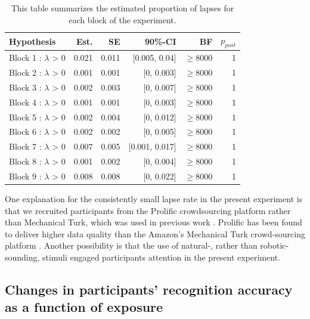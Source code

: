 \documentclass[
  11pt,
  man,mask,floatsintext]{apa6}
\begin{document}
\begin{table}[H]
\centering
\caption{\label{tab:hypothesis-table-lapse-by-block}This table summarizes the estimated proportion of lapses for each block of the experiment.}
\centering
\begin{tabular}[t]{>{\raggedright\arraybackslash}p{15em}rrrrr}
\toprule
Hypothesis & Est. & SE & 90\%-CI & BF & $p_{post}$\\
\midrule
Block 1 : $\lambda$ > 0 & 0.021 & 0.011 & {}[0.005, 0.04] & $\geq 8000 $ & 1\\
Block 2 : $\lambda$ > 0 & 0.001 & 0.001 & {}[0, 0.003] & $\geq 8000 $ & 1\\
Block 3 : $\lambda$ > 0 & 0.002 & 0.003 & {}[0, 0.007] & $\geq 8000 $ & 1\\
Block 4 : $\lambda$ > 0 & 0.001 & 0.001 & {}[0, 0.003] & $\geq 8000 $ & 1\\
Block 5 : $\lambda$ > 0 & 0.002 & 0.004 & {}[0, 0.012] & $\geq 8000 $ & 1\\
\addlinespace
Block 6 : $\lambda$ > 0 & 0.002 & 0.002 & {}[0, 0.005] & $\geq 8000 $ & 1\\
Block 7 : $\lambda$ > 0 & 0.007 & 0.005 & {}[0.001, 0.017] & $\geq 8000 $ & 1\\
Block 8 : $\lambda$ > 0 & 0.001 & 0.002 & {}[0, 0.004] & $\geq 8000 $ & 1\\
Block 9 : $\lambda$ > 0 & 0.008 & 0.008 & {}[0, 0.022] & $\geq 8000 $ & 1\\
\bottomrule
\end{tabular}
\end{table}

One explanation for the consistently small lapse rate in the present experiment is that we recruited participants from the Prolific crowdsourcing platform rather than Mechanical Turk, which was used in previous work \autocite{kleinschmidt-jaeger2016,kleinschmidt2020}. Prolific has been found to deliver higher data quality than the Amazon's Mechanical Turk crowd-sourcing platform \autocites{peer2017,adams2020,albert-smilek2023}[see also discussion in][]{bushong-jaeger2024}. Another possibility is that the use of natural-, rather than robotic-sounding, stimuli engaged participants attention in the present experiment.

\pagebreak

\subsection{Changes in participants' recognition accuracy as a function of exposure}\label{changes-in-participants-recognition-accuracy-as-a-function-of-exposure}
\end{document}
